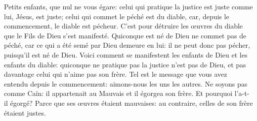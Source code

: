 Petits enfants, que nul ne vous égare:
	celui qui pratique la justice est juste comme lui, Jésus, est juste;
	celui qui commet le péché est du diable,
	car, depuis le commencement, le diable est pécheur.
C’est pour détruire les œuvres du diable que le Fils de Dieu s’est manifesté.
Quiconque est né de Dieu ne commet pas de péché,
	car ce qui a été semé par Dieu demeure en lui:
	il ne peut donc pas pécher, puisqu’il est né de Dieu.
Voici comment se manifestent les enfants de Dieu et les enfants du diable:
	quiconque ne pratique pas la justice n’est pas de Dieu,
	et pas davantage celui qui n’aime pas son frère.
Tel est le message que vous avez entendu depuis le commencement:
	aimons-nous les uns les autres.
Ne soyons pas comme Caïn:
	il appartenait au Mauvais et il égorgea son frère.
Et pourquoi l’a-t-il égorgé?
	Parce que ses œuvres étaient mauvaises:
	au contraire, celles de son frère étaient justes.
